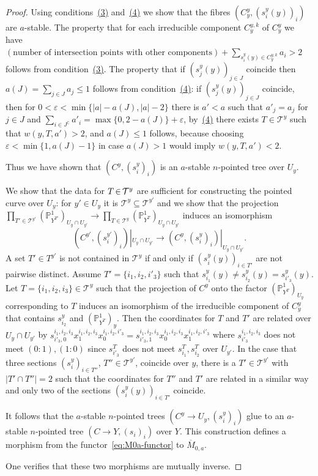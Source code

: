 \documentclass[ALCO,ThmDefs,Unicode,epreuves]{cedram}
\def\P{\mathds P}
\newcommand*{\Mk}{\mkern -2mu}
\begin{document}
\begin{proof}
Using conditions~\hyperlink{ancretrois}{(3)} and~\hyperlink{ancrequatre}{(4)} we 
show that the fibres $(C^y_y,(s^y_i(y))_i)$ 
are $a$-stable. The property that for each irreducible component 
$C^{y,k}_y$ of $C^y_y$ we have
$(\text{number of intersection points with other components})
+\sum_{s^y_i(y)\in C^{y,k}_y}a_i>2$ follows from condition~\hyperlink{ancretrois}{(3)}.
The property that if $(s^y_j(y))_{j\in J}$ coincide then $a(J)=\sum_{j\in J}a_j\leq 1$
follows from condition~\hyperlink{ancrequatre}{(4)}: if $(s^y_j(y))_{j\in J}$ coincide, then for 
$0<\varepsilon<\min\{|a|-a(J),|a|-2\}$ there is $a'<a$ such that $a'_j=a_j$ for 
$j\in J$ and $\sum_{i\in J^\complement}a'_i=\max\{0,2-a(J)\}+\varepsilon$, 
by~\hyperlink{ancrequatre}{(4)} there exists $T\in\mathcal T^y$ such that $w(y,T,a')>2$,
and $a(J)\leq 1$ follows, because choosing $\varepsilon<\min\{1,a(J)-1\}$ in case 
$a(J)>1$ would imply $w(y,T,a')<2$.

Thus we have shown that $(C^y,(s^y_i)_i)$ is an $a$-stable $n$-pointed tree over $U_y$.

We show that the data for $T\Mk \in\Mk \mathcal T^y$ are sufficient for constructing
the pointed curve over $U_y$: for $y'\in U_y$ it is 
$\mathcal T^y\subseteq\mathcal T^{y'}$ and we show that the
pro\-jection $\prod_{T'\in\mathcal T^{y'}}(\P^1_{Y^{T'}})_{U_y\cap U_{y'}}\to
\prod_{T\in\mathcal T^y}(\P^1_{Y^T})_{U_y\cap U_{y'}}$ induces an isomorphism
\[
(C^{y'},(s^{y'}_i)_i)|_{U_y\cap U_{y'}}\to(C^y,(s^y_i)_i)|_{U_y\cap U_{y'}}.
\]
A set $T'\in T^{y'}$ is not contained in $\mathcal T^y$ if and only if 
$(s^y_i(y))_{i\in T'}$ are not pairwise distinct. Assume $T'=\{i_1,i_2,i'_3\}$ 
such that $s^y_{i_1}(y)\neq s^y_{i_2}(y)=s^y_{i'_3}(y)$.
Let $T=\{i_1,i_2,i_3\}\in\mathcal T^y$ such that the projection of $C^y$ onto the factor 
$(\P^1_{Y^T})_{U_y}$ corresponding to $T$ induces an isomorphism of the irreducible
component of $C^y_y$ that contains $s^y_{i_2}$ and $(\P^1_{Y^T})_y$.
Then the coordinates for $T$ and $T'$ are related over $U_y\cap U_{y'}$ by
$s^{i_1,i_2,i_3}_{i'_3,0}x^{i_1,i_2,i_3}_1x^{i_1,i_2,i'_3}_0
=s^{i_1,i_2,i_3}_{i'_3,1}x^{i_1,i_2,i_3}_0x^{i_1,i_2,i'_3}_1$
where $s^{i_1,i_2,i_3}_{i'_3}$ does not meet $(0:1),(1:0)$ since 
$s^T_{i'_3}$ does not meet $s^T_{i_1},s^T_{i_2}$ over $U_{y'}$.
In the case that three sections $(s^y_i)_{i\in T''}$, $T''\in\mathcal T^{y'}$, 
coincide over $y$, there is a $T'\in\mathcal T^{y'}$ with $|T'\cap T''|=2$
such that the coordinates for $T''$ and $T'$ are related in a similar way and
only two of the sections $(s^y_i(y))_{i\in T'}$ coincide.

It follows that the $a$-stable $n$-pointed trees $(C^y\to U_y,(s^y_i)_i)$ glue to an
$a$-stable $n$-pointed tree $(C\to Y,(s_i)_i)$ over $Y$. This construction defines 
a morphism from the functor~\eqref{eq:M0a-functor} to $\overline{M}_{0,a}$.

One verifies that these two morphisms are mutually inverse.
\end{proof}
\end{document}
